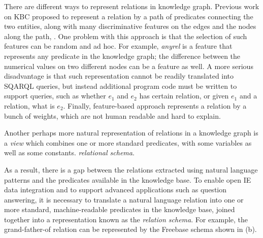 There are different ways to represent relations in knowledge graph. 
Previous work \cite{yao14, matt15} on KBC proposed to represent a relation
by a path of predicates connecting the two entities, 
along with many discriminative features on the edges and the nodes 
along the path, . One problem with this approach is
that the selection of such features can be random and ad hoc. 
For example, {\em anyrel} is a feature that represents any predicate 
in the knowledge graph; the difference between the numerical values 
on two different nodes can be a feature as well. A more serious
disadvantage is that such representation cannot be readily translated into
SQARQL queries, but instead additional program code must be written to support
queries, such as whether $e_1$ and $e_2$ has certain relation, or given
$e_1$ and a relation, what is $e_2$. Finally, feature-based approach
represents a relation by a bunch of weights, which are not human 
readable and hard to explain.

Another perhaps more natural representation of relations in a knowledge graph 
is a {\em view} which combines one or more standard predicates, with 
some variables as well as some constants.  {\em relational schema}.

As a result, there is a gap between the relations
extracted using natural language patterns and the predicates available in
the knowledge base. To enable open IE data integration and to
support advanced applications such as question answering, it is necessary
to translate a natural language relation into one or more standard, 
machine-readable predicates in the knowledge base, joined together into a
representation known as the {\em relation schema}. For example,
the grand-father-of relation can be represented by the Freebase schema shown 
in  (b).
 



